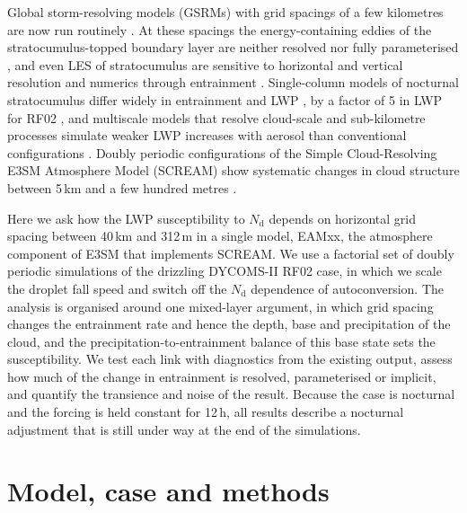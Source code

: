 \documentclass[acp, manuscript]{copernicus}
\newcommand{\Nd}{N_\mathrm{d}}
\begin{document}
Global storm-resolving models (GSRMs) with grid spacings of a few kilometres are now run routinely \citep{schneider2017,stevens2019dyamond,caldwell2021,donahue2024,stevens2020}. At these spacings the energy-containing eddies of the stratocumulus-topped boundary layer are neither resolved nor fully parameterised \citep{wyngaard2004,honnert2011,honnert2020,boutle2014,beare2014,efstathiou2015,derode2019}, and even LES of stratocumulus are sensitive to horizontal and vertical resolution and numerics through entrainment \citep{bretherton1999,stevens1999res,stevens1999les,stevens2005,pressel2017,mellado2018,matheou2019}. Single-column models of nocturnal stratocumulus differ widely in entrainment and LWP \citep{zhu2005}, by a factor of 5 in LWP for RF02 \citep{wyant2007}, and multiscale models that resolve cloud-scale and sub-kilometre processes simulate weaker LWP increases with aerosol than conventional configurations \citep{wangm2011,terai2020}. Doubly periodic configurations of the Simple Cloud-Resolving E3SM Atmosphere Model (SCREAM) show systematic changes in cloud structure between 5\,km and a few hundred metres \citep{bogenschutz2023,bogenschutz2025}.

Here we ask how the LWP susceptibility to $\Nd$ depends on horizontal grid spacing between 40\,km and 312\,m in a single model, EAMxx, the atmosphere component of E3SM that implements SCREAM. We use a factorial set of doubly periodic simulations of the drizzling DYCOMS-II RF02 case, in which we scale the droplet fall speed \citep[as in][]{mulmenstadt2024adj} and switch off the $\Nd$ dependence of autoconversion. The analysis is organised around one mixed-layer argument, in which grid spacing changes the entrainment rate and hence the depth, base and precipitation of the cloud, and the precipitation-to-entrainment balance of this base state sets the susceptibility. We test each link with diagnostics from the existing output, assess how much of the change in entrainment is resolved, parameterised or implicit, and quantify the transience and noise of the result. Because the case is nocturnal and the forcing is held constant for 12\,h, all results describe a nocturnal adjustment that is still under way at the end of the simulations.

\section{Model, case and methods}\label{sec:methods}
\end{document}
